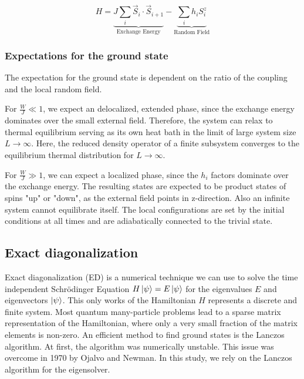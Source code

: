 \documentclass[reprint,amsmath,amssymb,aps,prb]{revtex4-2}
\begin{document}
\begin{equation}
	H=\underbrace{J\sum_i \vec{S}_i\cdot\vec{S}_{i+1}}_{\text{Exchange Energy}}-\underbrace{\sum_ih_iS_i^z}_{\text{Random Field}}\label{hamiltonian}
\end{equation}


\subsubsection{Expectations for the ground state}

The expectation for the ground state is dependent on the ratio of the coupling and the local random field. 

For $\frac{W}{J} \ll 1$, we expect an delocalized, extended phase, since the exchange energy dominates over the small external field. Therefore, the system can relax to thermal equilibrium serving as its own heat bath in the limit of large system size $L\rightarrow\infty$.
Here, the reduced density operator of a finite subsystem converges to the equilibrium thermal distribution
for $L\rightarrow\infty$.\cite{Pal2010}

For $\frac{W}{J} \gg 1$, we can expect a localized phase, since the $h_i$ factors dominate over the exchange energy. The resulting states are expected to be product states of spins "up" or "down", as the external field points in z-direction. Also an infinite system cannot equilibrate itself. The local configurations are set by the initial conditions at all times and are adiabatically connected to the trivial state.\cite{Pal2010}

\subsection{Exact diagonalization}

Exact diagonalization (ED) is a numerical technique we can use to solve the time independent Schrödinger Equation $H\ket{\psi}=E\ket{\psi}$ for the eigenvalues $E$ and eigenvectors $\ket{\psi}$. This only works of the Hamiltonian $H$ represents a discrete and finite system. Most quantum many-particle problems lead to a sparse matrix representation of the Hamiltonian, where only a very small fraction of the matrix
elements is non-zero.\cite{Weisse2008} An efficient method to find ground states is the Lanczos algorithm.\cite{Lanczos1950} At first, the algorithm was numerically unstable. This issue was overcome in 1970 by Ojalvo and Newman.\cite{Ojalvo1970} In this study, we rely on the Lanczos algorithm for the eigensolver.
\end{document}
